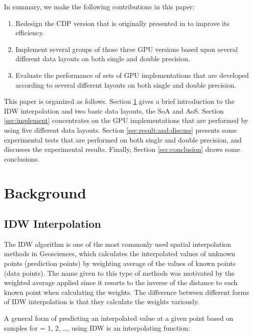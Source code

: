 In summary, we make the following contributions in this paper:

\begin{enumerate}[label=(\arabic*)]
\item Redesign the CDP version that is originally presented in \cite{mei2014} to improve its efficiency.

\item Implement several groups of those three GPU versions based upon several different data layouts
on both single and double precision. 

\item Evaluate the performance of sets of GPU implementations that are developed 
according to several different layouts on both single and double precision.
\end{enumerate}

This paper is organized as follows. Section \ref{sec:background} gives a brief 
introduction to the IDW interpolation and two basic 
data layouts, the SoA and AoS. Section \ref{sec:implement} concentrates on the 
GPU implementations that are performed  by using five different 
data layouts. Section \ref{sec:result:and:discuss} presents some experimental tests that are performed 
on both single and double precision, and discusses the experimental results. Finally, 
Section \ref{sec:conclusion} draws some conclusions.


\section{Background}
\label{sec:background}

\subsection{IDW Interpolation}
\label{sec:back:idw}

The IDW algorithm is one of the most commonly used spatial interpolation 
methods in Geosciences, which calculates the interpolated values of unknown 
points (prediction points) by weighting average of the values of known 
points (data points). The name given to this type of methods was motivated 
by the weighted average applied since it resorts to the inverse of the 
distance to each known point when calculating the weights. The difference 
between different forms of IDW interpolation is that they calculate the 
weights variously. 

A general form of predicting an interpolated value  at a given point  based 
on samples  for  = 1, 2, {\ldots},  using IDW is an 
interpolating function: 



